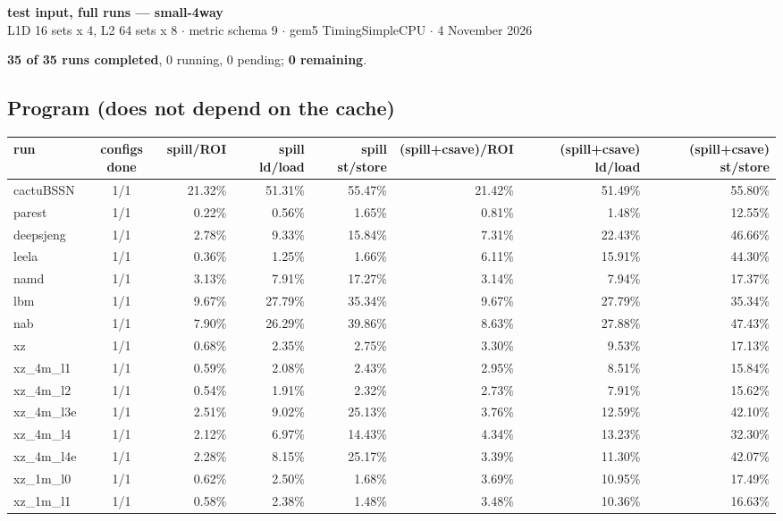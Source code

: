 \documentclass[10pt,a4paper,landscape]{article}
\begin{document}
\begin{center}
{\large\bfseries test input, full runs --- small-4way}\\[3pt]
{\small L1D 16 sets x 4, L2 64 sets x 8 $\cdot$ metric schema 9 $\cdot$ gem5 TimingSimpleCPU $\cdot$ 4 November 2026}
\end{center}
\textbf{35 of 35 runs completed}, 0 running, 0 pending; \textbf{0 remaining}.\par
\subsection*{Program (does not depend on the cache)}
{\footnotesize
\begin{longtable}{lcrrrrrr}
\toprule
run & configs done & spill/ROI & spill ld/load & spill st/store & (spill+csave)/ROI & (spill+csave) ld/load & (spill+csave) st/store \\
\midrule
\endhead
\bottomrule
\endfoot
cactuBSSN & 1/1 & 21.32\% & 51.31\% & 55.47\% & 21.42\% & 51.49\% & 55.80\% \\
parest & 1/1 & 0.22\% & 0.56\% & 1.65\% & 0.81\% & 1.48\% & 12.55\% \\
deepsjeng & 1/1 & 2.78\% & 9.33\% & 15.84\% & 7.31\% & 22.43\% & 46.66\% \\
leela & 1/1 & 0.36\% & 1.25\% & 1.66\% & 6.11\% & 15.91\% & 44.30\% \\
namd & 1/1 & 3.13\% & 7.91\% & 17.27\% & 3.14\% & 7.94\% & 17.37\% \\
lbm & 1/1 & 9.67\% & 27.79\% & 35.34\% & 9.67\% & 27.79\% & 35.34\% \\
nab & 1/1 & 7.90\% & 26.29\% & 39.86\% & 8.63\% & 27.88\% & 47.43\% \\
xz & 1/1 & 0.68\% & 2.35\% & 2.75\% & 3.30\% & 9.53\% & 17.13\% \\
xz\_4m\_l1 & 1/1 & 0.59\% & 2.08\% & 2.43\% & 2.95\% & 8.51\% & 15.84\% \\
xz\_4m\_l2 & 1/1 & 0.54\% & 1.91\% & 2.32\% & 2.73\% & 7.91\% & 15.62\% \\
xz\_4m\_l3e & 1/1 & 2.51\% & 9.02\% & 25.13\% & 3.76\% & 12.59\% & 42.10\% \\
xz\_4m\_l4 & 1/1 & 2.12\% & 6.97\% & 14.43\% & 4.34\% & 13.23\% & 32.30\% \\
xz\_4m\_l4e & 1/1 & 2.28\% & 8.15\% & 25.17\% & 3.39\% & 11.30\% & 42.07\% \\
xz\_1m\_l0 & 1/1 & 0.62\% & 2.50\% & 1.68\% & 3.69\% & 10.95\% & 17.49\% \\
xz\_1m\_l1 & 1/1 & 0.58\% & 2.38\% & 1.48\% & 3.48\% & 10.36\% & 16.63\% \\

\end{longtable}}
\end{document}
